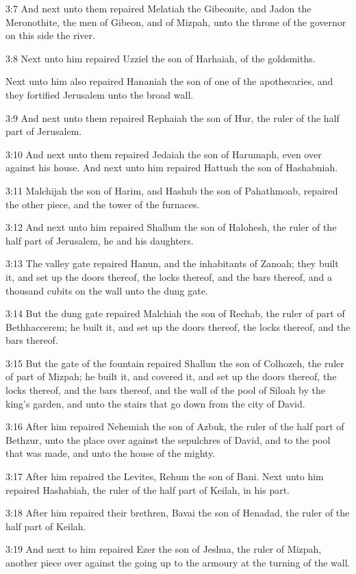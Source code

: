 3:7 And next unto them repaired Melatiah the Gibeonite, and Jadon the Meronothite, the men of Gibeon, and of Mizpah, unto the throne of the governor on this side the river.

3:8 Next unto him repaired Uzziel the son of Harhaiah, of the goldsmiths.

Next unto him also repaired Hananiah the son of one of the apothecaries, and they fortified Jerusalem unto the broad wall.

3:9 And next unto them repaired Rephaiah the son of Hur, the ruler of the half part of Jerusalem.

3:10 And next unto them repaired Jedaiah the son of Harumaph, even over against his house. And next unto him repaired Hattush the son of Hashabniah.

3:11 Malchijah the son of Harim, and Hashub the son of Pahathmoab, repaired the other piece, and the tower of the furnaces.

3:12 And next unto him repaired Shallum the son of Halohesh, the ruler of the half part of Jerusalem, he and his daughters.

3:13 The valley gate repaired Hanun, and the inhabitants of Zanoah; they built it, and set up the doors thereof, the locks thereof, and the bars thereof, and a thousand cubits on the wall unto the dung gate.

3:14 But the dung gate repaired Malchiah the son of Rechab, the ruler of part of Bethhaccerem; he built it, and set up the doors thereof, the locks thereof, and the bars thereof.

3:15 But the gate of the fountain repaired Shallun the son of Colhozeh, the ruler of part of Mizpah; he built it, and covered it, and set up the doors thereof, the locks thereof, and the bars thereof, and the wall of the pool of Siloah by the king's garden, and unto the stairs that go down from the city of David.

3:16 After him repaired Nehemiah the son of Azbuk, the ruler of the half part of Bethzur, unto the place over against the sepulchres of David, and to the pool that was made, and unto the house of the mighty.

3:17 After him repaired the Levites, Rehum the son of Bani. Next unto him repaired Hashabiah, the ruler of the half part of Keilah, in his part.

3:18 After him repaired their brethren, Bavai the son of Henadad, the ruler of the half part of Keilah.

3:19 And next to him repaired Ezer the son of Jeshua, the ruler of Mizpah, another piece over against the going up to the armoury at the turning of the wall.

